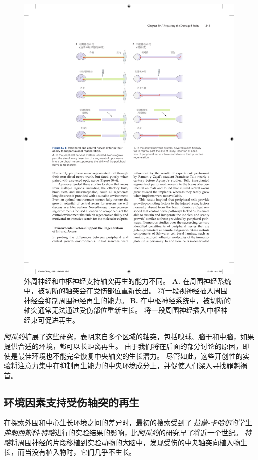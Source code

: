 \begin{figure}[htbp]
	\centering
	\includegraphics[width=0.85\linewidth]{chap50/fig_50_6}
	\caption{外周神经和中枢神经支持轴突再生的能力不同。
		\textbf{A.} 在周围神经系统中，被切断的轴突会在受伤部位重新长出。
		将一段视神经插入周围神经会抑制周围神经再生的能力。
		\textbf{B.} 在中枢神经系统中，被切断的轴突通常无法通过受伤部位重新生长。
		将一段周围神经插入中枢神经束可促进再生。}
	\label{fig:50_6}
\end{figure}


\textit{阿瓜约}扩展了这些研究，表明来自多个区域的轴突，包括嗅球、脑干和中脑，如果提供合适的环境，都可以长距离再生。
由于我们将在后面的部分讨论的原因，即使是最佳环境也不能完全恢复中央轴突的生长潜力。
尽管如此，这些开创性的实验将注意力集中在抑制再生能力的中央环境成分上，并促使人们深入寻找罪魁祸首。



\subsection{环境因素支持受伤轴突的再生}

在探索外围和中心生长环境之间的差异时，最初的搜索受到了 \textit{拉蒙-卡哈尔}的学生\textit{弗朗西斯科$\cdot$特略}进行的实验结果的影响，比\textit{阿瓜约}的研究早了将近一个世纪。
\textit{特略}将周围神经的片段移植到实验动物的大脑中，发现受伤的中央轴突向植入物生长，而当没有植入物时，它们几乎不生长。


